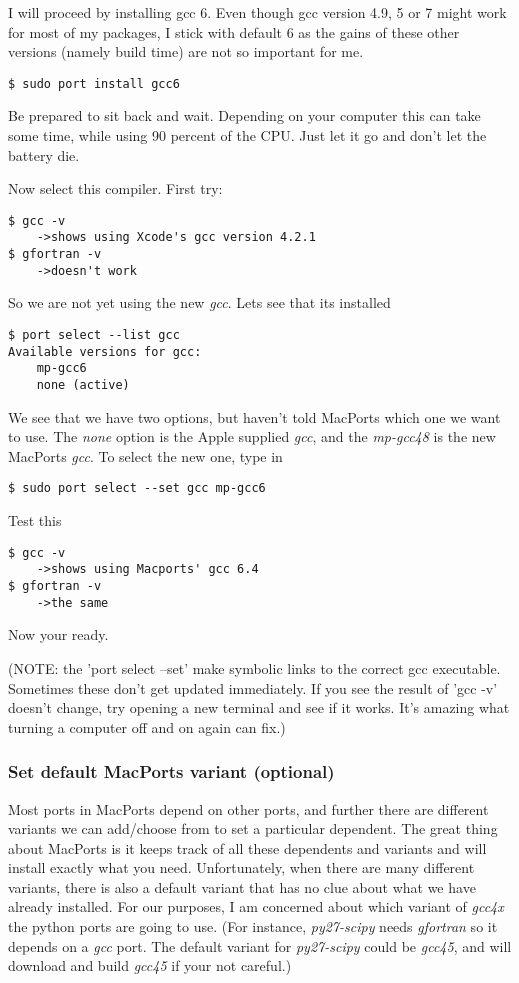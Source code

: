 \documentclass[11pt, A4paper]{article}
\begin{document}
I will proceed by installing gcc 6. Even though gcc version 4.9, 5 or 7 might work for most of my packages, I stick with default 6 as the gains of these other versions (namely build time) are not so important for me.
\begin{lstlisting}[style=Bash]
$ sudo port install gcc6
\end{lstlisting}
Be prepared to sit back and wait. Depending on your computer this can take some time, while using 90 percent of the CPU. Just let it go and don't let the battery die.

Now select this compiler. First try:
\begin{lstlisting}[style=Bash]
$ gcc -v
    ->shows using Xcode's gcc version 4.2.1
$ gfortran -v 
    ->doesn't work
\end{lstlisting}
So we are not yet using the new \textit{gcc}. Lets see that its installed
\begin{lstlisting}[style=Bash]
$ port select --list gcc
Available versions for gcc:
	mp-gcc6
	none (active)
\end{lstlisting}
We see that we have two options, but haven't told MacPorts which one we want to use. The \textit{none} option is the Apple supplied \textit{gcc}, and the \textit{mp-gcc48} is the new MacPorts \textit{gcc}. To select the new one, type in
\begin{lstlisting}[style=Bash]
$ sudo port select --set gcc mp-gcc6
\end{lstlisting}
Test this
\begin{lstlisting}[style=Bash]
$ gcc -v
    ->shows using Macports' gcc 6.4
$ gfortran -v
    ->the same
\end{lstlisting}
Now your ready. 

(NOTE: the 'port select --set' make symbolic links to the correct gcc executable. Sometimes these don't get updated immediately. If you see the result of 'gcc -v' doesn't change, try opening a new terminal and see if it works. It's amazing what turning a computer off and on again can fix.)


\subsubsection{Set default MacPorts variant (optional)}
Most ports in MacPorts depend on other ports, and further there are different variants we can add/choose from to set a particular dependent. The great thing about MacPorts is it keeps track of all these dependents and variants and will install exactly what you need. Unfortunately, when there are many different variants, there is also a default variant that has no clue about what we have already installed. For our purposes, I am concerned about which variant of \textit{gcc4x} the python ports are going to use. (For instance, \textit{py27-scipy} needs \textit{gfortran} so it depends on a \textit{gcc} port. The default variant for \textit{py27-scipy} could be \textit{gcc45}, and will download and build \textit{gcc45} if your not careful.)
\end{document}
